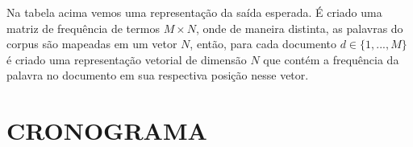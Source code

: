 \documentclass[12pt,a4paper]{article}
\begin{document}
  
  Na tabela acima vemos uma representação da saída esperada. É criado uma matriz de frequência de termos $M \times N$, onde de maneira distinta, as palavras do corpus são mapeadas em um vetor $N$, então, para cada documento $d \in \{1,. . . , M\}$ é criado uma representação vetorial de dimensão $N$ que contém a frequência da palavra no documento em sua respectiva posição nesse vetor.
  
  
  \section{CRONOGRAMA}
  
  \def\refname{REFERÊNCIAS BIBLIOGRÁFICAS}
  
  
  
  
\end{document}
